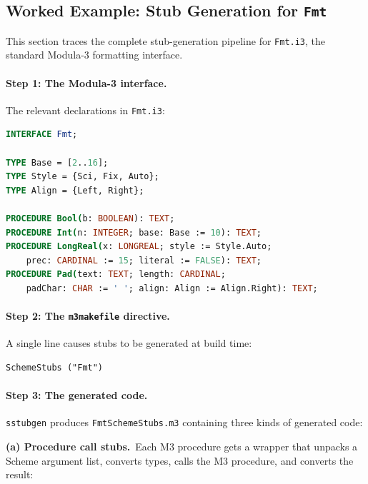 \documentclass[12pt]{report}
\begin{document}
\subsection{Worked Example: Stub Generation for {\tt Fmt}}\label{sec:fmtexample}

This section traces the complete stub-generation pipeline for
{\tt Fmt.i3}, the standard Modula-3 formatting interface.

\paragraph{Step 1: The Modula-3 interface.}
The relevant declarations in {\tt Fmt.i3}:

\begin{lstlisting}[language=Modula3]
INTERFACE Fmt;

TYPE Base = [2..16];
TYPE Style = {Sci, Fix, Auto};
TYPE Align = {Left, Right};

PROCEDURE Bool(b: BOOLEAN): TEXT;
PROCEDURE Int(n: INTEGER; base: Base := 10): TEXT;
PROCEDURE LongReal(x: LONGREAL; style := Style.Auto;
    prec: CARDINAL := 15; literal := FALSE): TEXT;
PROCEDURE Pad(text: TEXT; length: CARDINAL;
    padChar: CHAR := ' '; align: Align := Align.Right): TEXT;
\end{lstlisting}

\paragraph{Step 2: The {\tt m3makefile} directive.}
A single line causes stubs to be generated at build time:

\begin{lstlisting}[language={}]
SchemeStubs ("Fmt")
\end{lstlisting}

\paragraph{Step 3: The generated code.}
{\tt sstubgen} produces {\tt FmtSchemeStubs.m3} containing three
kinds of generated code:

\medskip\noindent\textbf{(a) Procedure call stubs.}\  Each M3 procedure gets a wrapper
that unpacks a Scheme argument list, converts types, calls the M3
procedure, and converts the result:
\end{document}
